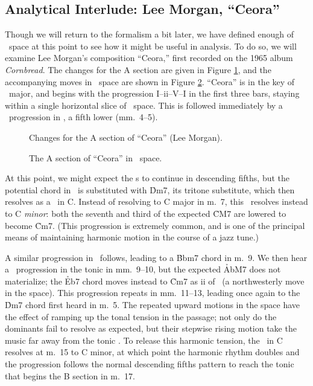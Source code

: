 


\FloatBarrier

\subsection{Analytical Interlude: Lee Morgan, “Ceora”}
\label{sec:ceora-analysis}

Though we will return to the formalism a bit later, we have defined enough of
\tf\ space at this point to see how it might be useful in analysis. To do so,
we will examine Lee Morgan's composition ``Ceora,'' first recorded on the 1965
album \emph{Cornbread}. The changes for the A section are given in
Figure \ref{tf:ceora-changes-1}, and the accompanying moves in \tf\ space are
shown in Figure \ref{tf:ceora-space-1}. ``Ceora'' is in the key of
\Aflat\ major, and begins with the progression I--ii--V--I in the first three
bars, staying within a single horizontal slice of \tf\ space. This is followed
immediately by a \tfo\ progression in \Dflat, a fifth lower (mm.~4--5).

\begin{figure}[thbp]
  \caption{Changes for the A section of ``Ceora'' (Lee Morgan).}
  \label{tf:ceora-changes-1}
\end{figure}

\begin{figure}[htbp]
  \caption{The A section of ``Ceora'' in \tf\ space.}
  \label{tf:ceora-space-1}
\end{figure}

At this point, we might expect the \tf{}s to continue in descending
fifths, but the potential \ii chord in \Gflat\ is substituted with
\h{Dm7}, its tritone substitute, which then resolves as a \tf\ in C.
Instead of resolving to C major in m.~7, this \tf\ resolves instead to C
\emph{minor}: both the seventh and third of the expected \h{CM7} are lowered
to become \h{Cm7}. (This progression is extremely common, and is one of the
principal means of maintaining harmonic motion in the course of a jazz tune.)

A similar progression in \Bflat\ follows, leading to a \h{Bbm7} chord in m.~9.
We then hear a \tf\ progression in the tonic in mm.~9--10, but the
expected \h{AbM7} does not materialize; the \h{Eb7} chord moves instead to
\h{Cm7} as ii of \Bflat\ (a northwesterly move in the space). This
progression repeats in mm.~11--13, leading once again to the \h{Dm7} chord
first heard in m.~5. The repeated upward motions in the space have the
effect of ramping up the tonal tension in the passage; not only do the
dominants fail to resolve as expected, but their stepwise rising motion take
the music far away from the tonic \Aflat. To release this harmonic tension,
the \tf\ in C resolves at m.~15 to C minor, at which point the harmonic rhythm
doubles and the progression follows the normal descending fifths pattern to
reach the tonic that begins the B section in m.~17.

